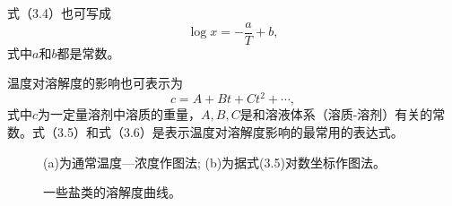式（3.4）也可写成
\begin{equation}
\log x = -\frac{a}{T} + b,
\end{equation}
式中$a$和$b$都是常数。

温度对溶解度的影响也可表示为
\begin{equation}
c=A+Bt+Ct^2+\cdots,
\end{equation}
式中$c$为一定量溶剂中溶质的重量，$A,B,C$是和溶液体系（溶质-溶剂）有关的常数。式（3.5）和式（3.6）是表示温度对溶解度影响的最常用的表达式。

\begin{figure}[hpb]
 \centering
 \caption{一些盐类的溶解度曲线。}
 (a)为通常温度—浓度作图法; (b)为据式(3.5)对数坐标作图法。
\end{figure}

